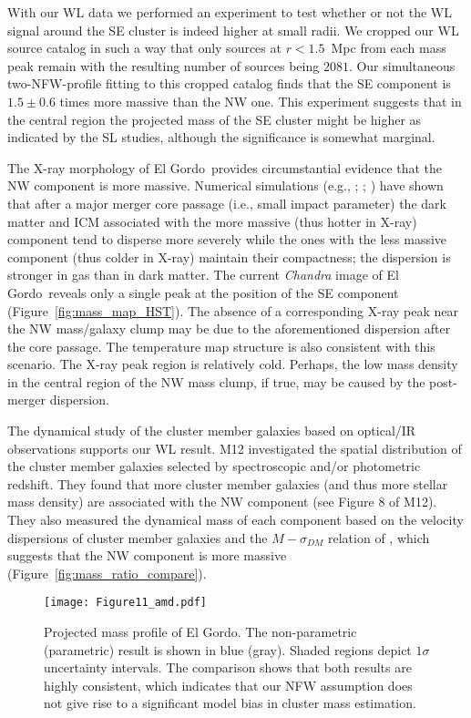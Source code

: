\documentclass[twocolumn]{aastex631}
\newcommand{\elgordo}{El Gordo}
\begin{document}
With our WL data we performed an experiment to test whether or not the WL signal around the SE cluster is indeed higher at small radii. 
We cropped our WL source catalog in such a way that only sources at $r<1.5$~Mpc from each mass peak remain with the resulting number of sources being $2081$. 
Our simultaneous two-NFW-profile fitting to this cropped catalog finds that the SE component is $1.5\pm0.6$ times more massive than the NW one. 
This experiment suggests that in the central region the projected mass of the SE cluster might be higher as indicated by the SL studies, although the significance is somewhat marginal. 


The X-ray morphology of \elgordo~provides circumstantial evidence that the NW component is more massive. 
Numerical simulations (e.g., \citealt{Mastropietro2008}; \citealt{Molnar2015}; \citealt{Moura2021}) have shown that after a major merger core passage (i.e., small impact parameter) the dark matter and ICM associated with the more massive (thus hotter in X-ray) component tend to disperse more severely while the ones with the less massive component (thus colder in X-ray) maintain their compactness; the dispersion is stronger in gas than in dark matter. 
The current {\it Chandra} image of \elgordo~reveals only a single peak at the position of the SE component (Figure~\ref{fig:mass_map_HST}). 
The absence of a corresponding X-ray peak near the NW mass/galaxy clump may be due to the aforementioned dispersion after the core passage. 
The temperature map structure is also consistent with this scenario. The X-ray peak region is relatively cold. Perhaps, the low mass density in the central region of the NW mass clump, if true, may be caused by the post-merger dispersion. 


The dynamical study of the cluster member galaxies based on optical/IR observations supports our WL result. 
M12 investigated the spatial distribution of the cluster member galaxies selected by spectroscopic and/or photometric redshift. 
They found that more cluster member galaxies (and thus more stellar mass density) are associated with the NW component (see Figure 8 of M12). They also measured the dynamical mass of each component based on the velocity dispersions of cluster member galaxies and the $M-\sigma_{DM}$ relation of \cite{Evrard2008}, which suggests that the NW component is more massive (Figure~\ref{fig:mass_ratio_compare}).



\begin{figure}
\centering
\texttt{[image: Figure11\_amd.pdf]}
\caption{Projected mass profile of \elgordo. 
The non-parametric (parametric) result is shown in blue (gray). Shaded regions depict $1\sigma$ uncertainty intervals. The comparison shows that both results are highly consistent, which indicates that our NFW assumption does not give rise to a significant model bias in cluster mass estimation.}
\label{fig:AMD}
\end{figure}
\end{document}
